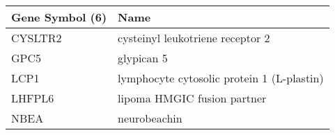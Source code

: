 \begin{tabular}{ll}
\toprule
Gene Symbol (6) &                                       Name \\
\midrule
        CYSLTR2 &           cysteinyl leukotriene receptor 2 \\
           GPC5 &                                 glypican 5 \\
           LCP1 & lymphocyte cytosolic protein 1 (L-plastin) \\
         LHFPL6 &                lipoma HMGIC fusion partner \\
           NBEA &                               neurobeachin \\
\bottomrule
\end{tabular}
